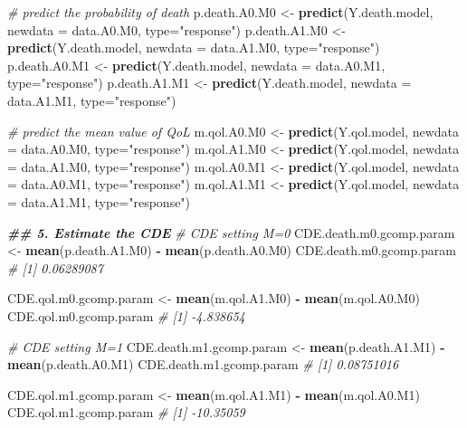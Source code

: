 \documentclass[
]{book}
\newenvironment{Shaded}{\begin{snugshade}}{\end{snugshade}}
\newcommand{\AttributeTok}[1]{\textcolor[rgb]{0.13,0.29,0.53}{#1}}
\newcommand{\CommentTok}[1]{\textcolor[rgb]{0.56,0.35,0.01}{\textit{#1}}}
\newcommand{\DocumentationTok}[1]{\textcolor[rgb]{0.56,0.35,0.01}{\textbf{\textit{#1}}}}
\newcommand{\FunctionTok}[1]{\textcolor[rgb]{0.13,0.29,0.53}{\textbf{#1}}}
\newcommand{\NormalTok}[1]{#1}
\newcommand{\OtherTok}[1]{\textcolor[rgb]{0.56,0.35,0.01}{#1}}
\newcommand{\SpecialCharTok}[1]{\textcolor[rgb]{0.81,0.36,0.00}{\textbf{#1}}}
\newcommand{\StringTok}[1]{\textcolor[rgb]{0.31,0.60,0.02}{#1}}
\begin{document}
\begin{Shaded}
\begin{Highlighting}[]
\CommentTok{\# predict the probability of death}
\NormalTok{p.death.A0.M0 }\OtherTok{\textless{}{-}} \FunctionTok{predict}\NormalTok{(Y.death.model, }\AttributeTok{newdata =}\NormalTok{ data.A0.M0, }\AttributeTok{type=}\StringTok{"response"}\NormalTok{)}
\NormalTok{p.death.A1.M0 }\OtherTok{\textless{}{-}} \FunctionTok{predict}\NormalTok{(Y.death.model, }\AttributeTok{newdata =}\NormalTok{ data.A1.M0, }\AttributeTok{type=}\StringTok{"response"}\NormalTok{)}
\NormalTok{p.death.A0.M1 }\OtherTok{\textless{}{-}} \FunctionTok{predict}\NormalTok{(Y.death.model, }\AttributeTok{newdata =}\NormalTok{ data.A0.M1, }\AttributeTok{type=}\StringTok{"response"}\NormalTok{)}
\NormalTok{p.death.A1.M1 }\OtherTok{\textless{}{-}} \FunctionTok{predict}\NormalTok{(Y.death.model, }\AttributeTok{newdata =}\NormalTok{ data.A1.M1, }\AttributeTok{type=}\StringTok{"response"}\NormalTok{)}

\CommentTok{\# predict the mean value of QoL}
\NormalTok{m.qol.A0.M0 }\OtherTok{\textless{}{-}} \FunctionTok{predict}\NormalTok{(Y.qol.model, }\AttributeTok{newdata =}\NormalTok{ data.A0.M0, }\AttributeTok{type=}\StringTok{"response"}\NormalTok{)}
\NormalTok{m.qol.A1.M0 }\OtherTok{\textless{}{-}} \FunctionTok{predict}\NormalTok{(Y.qol.model, }\AttributeTok{newdata =}\NormalTok{ data.A1.M0, }\AttributeTok{type=}\StringTok{"response"}\NormalTok{)}
\NormalTok{m.qol.A0.M1 }\OtherTok{\textless{}{-}} \FunctionTok{predict}\NormalTok{(Y.qol.model, }\AttributeTok{newdata =}\NormalTok{ data.A0.M1, }\AttributeTok{type=}\StringTok{"response"}\NormalTok{)}
\NormalTok{m.qol.A1.M1 }\OtherTok{\textless{}{-}} \FunctionTok{predict}\NormalTok{(Y.qol.model, }\AttributeTok{newdata =}\NormalTok{ data.A1.M1, }\AttributeTok{type=}\StringTok{"response"}\NormalTok{)}

\DocumentationTok{\#\# 5. Estimate the CDE}
\CommentTok{\# CDE setting M=0}
\NormalTok{CDE.death.m0.gcomp.param }\OtherTok{\textless{}{-}} \FunctionTok{mean}\NormalTok{(p.death.A1.M0) }\SpecialCharTok{{-}} \FunctionTok{mean}\NormalTok{(p.death.A0.M0)}
\NormalTok{CDE.death.m0.gcomp.param}
\CommentTok{\# [1] 0.06289087}

\NormalTok{CDE.qol.m0.gcomp.param }\OtherTok{\textless{}{-}} \FunctionTok{mean}\NormalTok{(m.qol.A1.M0) }\SpecialCharTok{{-}} \FunctionTok{mean}\NormalTok{(m.qol.A0.M0)}
\NormalTok{CDE.qol.m0.gcomp.param}
\CommentTok{\# [1] {-}4.838654}

\CommentTok{\# CDE setting M=1}
\NormalTok{CDE.death.m1.gcomp.param }\OtherTok{\textless{}{-}} \FunctionTok{mean}\NormalTok{(p.death.A1.M1) }\SpecialCharTok{{-}} \FunctionTok{mean}\NormalTok{(p.death.A0.M1)}
\NormalTok{CDE.death.m1.gcomp.param}
\CommentTok{\# [1] 0.08751016}

\NormalTok{CDE.qol.m1.gcomp.param }\OtherTok{\textless{}{-}} \FunctionTok{mean}\NormalTok{(m.qol.A1.M1) }\SpecialCharTok{{-}} \FunctionTok{mean}\NormalTok{(m.qol.A0.M1)}
\NormalTok{CDE.qol.m1.gcomp.param}
\CommentTok{\# [1] {-}10.35059}
\end{Highlighting}
\end{Shaded}
\end{document}
